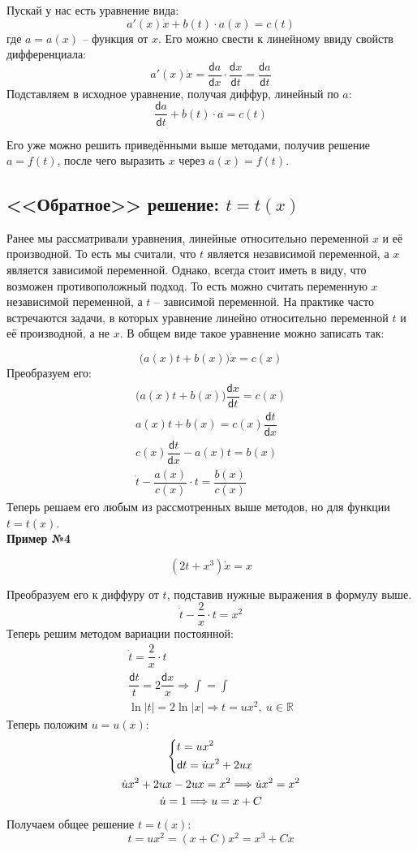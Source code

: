 \documentclass[a4paper,12pt]{article}
\newcommand{\R}{\mathbb{R}}
\renewcommand{\d}{\mathsf{d}}
\newcommand{\dt}{\dot{t}}
\newcommand{\du}{\dot{u}}
\newcommand{\dx}{\dot{x}}
\newcommand{\ds}{\displaystyle}
\begin{document}
Пускай у нас есть уравнение вида: \[a'(x)\dx + b(t)\cdot a(x) = c(t)\] где $a = a(x)$ -- функция от \underline{$x$}. Его можно свести к линейному ввиду свойств дифференциала:
\[a'(x)\dx = \dfrac{\d a}{\d x} \cdot \dfrac{\d x}{\d t} = \dfrac{\d a}{\d t}\]
Подставляем в исходное уравнение, получая диффур, линейный по \underline{$a$}:
\[\dfrac{\d a}{\d t} + b(t) \cdot a = c(t)\]

Его уже можно решить приведёнными выше методами, получив решение $a = f(t)$, после чего выразить $x$ через $a(x) = f(t)$.

\subsection{<<Обратное>> решение: $t = t(x)$}

Ранее мы рассматривали уравнения, линейные относительно переменной $x$ и её производной. То есть мы считали, что $t$ является независимой переменной, а $x$ является зависимой переменной. Однако, всегда стоит иметь в виду, что возможен противоположный подход. То есть можно считать переменную $x$ независимой переменной, а $t$ – зависимой переменной. На практике часто встречаются задачи, в которых уравнение линейно относительно переменной $t$ и её производной, а не $x$. В общем виде такое уравнение можно записать так:

\[\big(a(x)t + b(x)\big)\dx = c(x)\]
Преобразуем его:
\begin{gather*}
	\big(a(x)t + b(x)\big)\dfrac{\d x}{\d t} = c(x)\\
	a(x)t + b(x) = c(x)\dfrac{\d t}{\d x}\\
	c(x)\dfrac{\d t}{\d x} - a(x)t = b(x)\\
	\dt - \dfrac{a(x)}{c(x)}\cdot t = \dfrac{b(x)}{c(x)}
\end{gather*}
Теперь решаем его любым из рассмотренных выше методов, но для функции $t = t(x)$.
\ \\

\textbf{Пример №4}

\[(2t + x^3)\dx = x\]

Преобразуем его к диффуру от $t$, подставив нужные выражения в формулу выше.
\[\dt - \dfrac{2}{x} \cdot t = x^2\]
Теперь решим методом вариации постоянной:
\begin{gather*}
\dt = \dfrac{2}{x} \cdot t\\
\dfrac{\d t}{t} = 2\dfrac{\d x}{x} \Longrightarrow \ds\int = \int\\
\ln|t| = 2\ln|x| \Longrightarrow t = ux^2,\ u \in \R
\end{gather*}
Теперь положим $u = u(x)$:
\begin{gather*}
\left\{\begin{gathered}
t = ux^2\hfill\\
\d t = \du x^2 + 2ux\hfill
\end{gathered}\right.\\
\du x^2 + 2ux - 2ux = x^2 \Longrightarrow \du x^2 = x^2\\
\du = 1 \Longrightarrow u = x + C
\end{gather*}
Получаем общее решение $t = t(x)$:
\[t = ux^2 = (x + C)x^2 = x^3 + Cx\]
\end{document}

